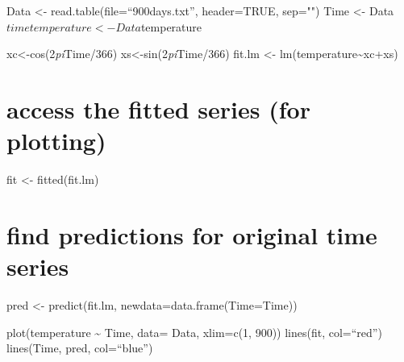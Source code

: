 \documentclass[
]{article}
\begin{document}
Data \textless- read.table(file=``900days.txt'', header=TRUE, sep="")
Time \textless- Data\(time temperature <- Data\)temperature

xc\textless-cos(2\emph{pi}Time/366) xs\textless-sin(2\emph{pi}Time/366)
fit.lm \textless- lm(temperature\textasciitilde xc+xs)

\hypertarget{access-the-fitted-series-for-plotting}{%
\section{access the fitted series (for
plotting)}\label{access-the-fitted-series-for-plotting}}

fit \textless- fitted(fit.lm)

\hypertarget{find-predictions-for-original-time-series}{%
\section{find predictions for original time
series}\label{find-predictions-for-original-time-series}}

pred \textless- predict(fit.lm, newdata=data.frame(Time=Time))

plot(temperature \textasciitilde{} Time, data= Data, xlim=c(1, 900))
lines(fit, col=``red'') lines(Time, pred, col=``blue'')
\end{document}

